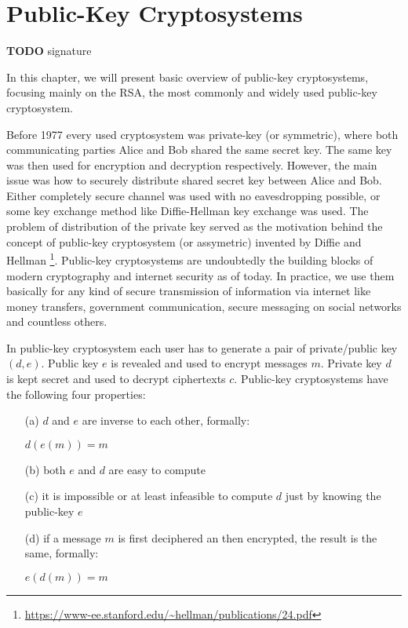 \chapter{Public-Key Cryptosystems}

\textbf{TODO } signature

In this chapter, we will present basic overview of public-key cryptosystems, focusing mainly on the RSA, the most commonly and widely used public-key cryptosystem. 

Before 1977 every used cryptosystem was private-key (or symmetric), where both communicating parties Alice and Bob shared the same secret key. The same key was then used for encryption and decryption respectively. However, the main issue was how to securely distribute shared secret key between Alice and Bob. Either completely secure channel was used with no eavesdropping possible, or some key exchange method like Diffie-Hellman key exchange\cite{diffie_hellman} was used. The problem of distribution of the private key served as the motivation behind the concept of public-key cryptosystem (or assymetric) invented by Diffie and Hellman \cite{diffie_hellman}\footnote{\url{https://www-ee.stanford.edu/~hellman/publications/24.pdf}}. Public-key cryptosystems are undoubtedly the building blocks of modern cryptography and internet security as of today. In practice, we use them basically for any kind of secure transmission of information via internet like money transfers, government communication, secure messaging on social networks and countless others.

In public-key cryptosystem each user has to generate a pair of private/public key $(d,e)$. Public key $e$ is revealed and used to encrypt messages $m$. Private key $d$ is kept secret and used to decrypt ciphertexts $c$. Public-key cryptosystems have the following four properties:

\begin{itemize}

	\item[(a)] $d$ and $e$ are inverse to each other, formally:

$d(e(m)) = m$

	\item[(b)] both $e$ and $d$ are easy to compute

	\item[(c)] it is impossible or at least infeasible to compute $d$ just by knowing the public-key $e$

	\item[(d)] if a message $m$ is first deciphered an then encrypted, the result is the same, formally:
    
$e(d(m)) = m$

\end{itemize}

